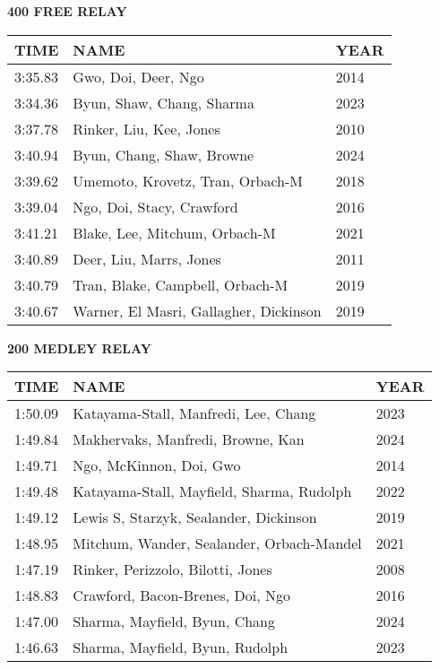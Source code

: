 \begin{table}[H]
\centering
\begin{minipage}[t]{0.6\textwidth}
\centering
\textbf{400 FREE RELAY}\\[0.1cm]
\begin{tabular}{@{}p{1.8cm}p{2.8cm}p{1.2cm}@{}}
\hline
    \textbf{TIME} & \textbf{NAME} & \textbf{YEAR} \\
\hline
    3:35.83 & Gwo, Doi, Deer, Ngo & 2014 \\
    3:34.36 & Byun, Shaw, Chang, Sharma & 2023 \\
    3:37.78 & Rinker, Liu, Kee, Jones & 2010 \\
    3:40.94 & Byun, Chang, Shaw, Browne & 2024 \\
    3:39.62 & Umemoto, Krovetz, Tran, Orbach-M & 2018 \\
    3:39.04 & Ngo, Doi, Stacy, Crawford & 2016 \\
    3:41.21 & Blake, Lee, Mitchum, Orbach-M & 2021 \\
    3:40.89 & Deer, Liu, Marrs, Jones & 2011 \\
    3:40.79 & Tran, Blake, Campbell, Orbach-M & 2019 \\
    3:40.67 & Warner, El Masri, Gallagher, Dickinson & 2019 \\
\hline
\end{tabular}
\end{minipage}
\end{table}

\begin{table}[H]
\centering
\begin{minipage}[t]{0.6\textwidth}
\centering
\textbf{200 MEDLEY RELAY}\\[0.1cm]
\begin{tabular}{@{}p{1.8cm}p{2.8cm}p{1.2cm}@{}}
\hline
    \textbf{TIME} & \textbf{NAME} & \textbf{YEAR} \\
\hline
    1:50.09 & Katayama-Stall, Manfredi, Lee, Chang & 2023 \\
    1:49.84 & Makhervaks, Manfredi, Browne, Kan & 2024 \\
    1:49.71 & Ngo, McKinnon, Doi, Gwo & 2014 \\
    1:49.48 & Katayama-Stall, Mayfield, Sharma, Rudolph & 2022 \\
    1:49.12 & Lewis S, Starzyk, Sealander, Dickinson & 2019 \\
    1:48.95 & Mitchum, Wander, Sealander, Orbach-Mandel & 2021 \\
    1:47.19 & Rinker, Perizzolo, Bilotti, Jones & 2008 \\
    1:48.83 & Crawford, Bacon-Brenes, Doi, Ngo & 2016 \\
    1:47.00 & Sharma, Mayfield, Byun, Chang & 2024 \\
    1:46.63 & Sharma, Mayfield, Byun, Rudolph & 2023 \\
\hline
\end{tabular}
\end{minipage}
\end{table}

